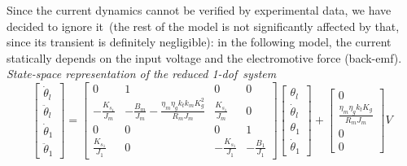 Since the current dynamics cannot be verified by experimental data, we have decided to ignore it~(the rest of the model is not significantly affected by that, since its transient is definitely negligible): in the following model, the current statically depends on the input voltage and the electromotive force (back-emf).\\
\noindent \textit{State-space representation of the reduced \acrshort{1-dof}\ system}
\begin{equation}
	\begin{bmatrix}
		\dot{\theta}_l \\
		\ddot{\theta}_l \\
		\dot{\theta}_1 \\
		\ddot{\theta}_1
	\end{bmatrix}
	=
	\begin{bmatrix}
		0 &1 & 0 & 0 \\
		-\frac{K_{s_1}}{J_m} & -\frac{B_m}{J_m}-\frac{\eta_m \eta_g k_t k_m K^2_g}{R_m J_m}  & \frac{K_{s_1}}{J_m} & 0 \\
		0 & 0 & 0 & 1 \\
		\frac{K_{s_1}}{J_1} & 0 & -\frac{K_{s_1}}{J_1} & -\frac{B_1}{J_1}
	\end{bmatrix}
	\begin{bmatrix}
		\theta_l \\
		\dot{\theta}_l \\
		\theta_1 \\
		\dot{\theta}_1
	\end{bmatrix}
	+
	\begin{bmatrix}
		0 \\
		\frac{\eta_m \eta_g k_t K_g}{R_m J_m} \\
		0 \\
		0
	\end{bmatrix}
	V
\end{equation}

